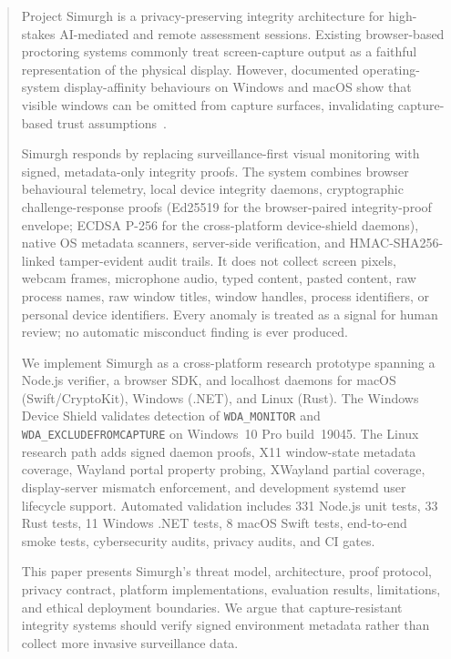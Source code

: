 \documentclass[conference]{IEEEtran}
\begin{document}
\begin{abstract}
Project Simurgh is a privacy-preserving integrity architecture for high-stakes AI-mediated and remote assessment sessions. Existing browser-based proctoring systems commonly treat screen-capture output as a faithful representation of the physical display. However, documented operating-system display-affinity behaviours on Windows and macOS show that visible windows can be omitted from capture surfaces, invalidating capture-based trust assumptions~\cite{abedini2026invisible}.

Simurgh responds by replacing surveillance-first visual monitoring with signed, metadata-only integrity proofs. The system combines browser behavioural telemetry, local device integrity daemons, cryptographic challenge-response proofs (Ed25519 for the browser-paired integrity-proof envelope; ECDSA P-256 for the cross-platform device-shield daemons), native OS metadata scanners, server-side verification, and HMAC-SHA256-linked tamper-evident audit trails. It does not collect screen pixels, webcam frames, microphone audio, typed content, pasted content, raw process names, raw window titles, window handles, process identifiers, or personal device identifiers. Every anomaly is treated as a signal for human review; no automatic misconduct finding is ever produced.

We implement Simurgh as a cross-platform research prototype spanning a Node.js verifier, a browser SDK, and localhost daemons for macOS (Swift/CryptoKit), Windows (.NET), and Linux (Rust). The Windows Device Shield validates detection of \texttt{WDA\_MONITOR} and \texttt{WDA\_EXCLUDEFROMCAPTURE} on Windows~10 Pro build~19045. The Linux research path adds signed daemon proofs, X11 window-state metadata coverage, Wayland portal property probing, XWayland partial coverage, display-server mismatch enforcement, and development systemd user lifecycle support. Automated validation includes 331 Node.js unit tests, 33 Rust tests, 11 Windows .NET tests, 8 macOS Swift tests, end-to-end smoke tests, cybersecurity audits, privacy audits, and CI gates.

This paper presents Simurgh's threat model, architecture, proof protocol, privacy contract, platform implementations, evaluation results, limitations, and ethical deployment boundaries. We argue that capture-resistant integrity systems should verify signed environment metadata rather than collect more invasive surveillance data.
\end{abstract}
\end{document}
